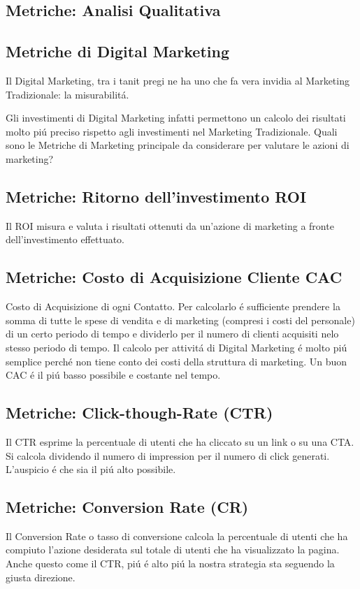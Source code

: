 \documentclass{article}
\begin{document}
\subsection{Metriche: Analisi Qualitativa}

\subsection{Metriche di Digital Marketing}
Il Digital Marketing, tra i tanit pregi ne ha uno che fa vera invidia al Marketing Tradizionale: la misurabilit\'a.

Gli investimenti di Digital Marketing infatti permettono un calcolo dei risultati molto pi\'u preciso rispetto agli investimenti nel Marketing Tradizionale. Quali sono le Metriche di Marketing principale da considerare per valutare le azioni di marketing?

\subsection{Metriche: Ritorno dell'investimento ROI}
Il ROI misura e valuta i risultati ottenuti da un'azione di marketing a fronte dell'investimento effettuato.

\subsection{Metriche: Costo di Acquisizione Cliente CAC}
Costo di Acquisizione di ogni Contatto. Per calcolarlo \'e sufficiente prendere la somma di tutte le spese di vendita e di marketing (compresi i costi del personale) di un certo periodo di tempo e dividerlo per il numero di clienti acquisiti nelo stesso periodo di tempo. Il calcolo per attivit\'a di Digital Marketing \'e molto pi\'u semplice perch\'e non tiene conto dei costi della struttura di marketing. Un buon CAC \'e il pi\'u basso possibile e costante nel tempo.  

\subsection{Metriche: Click-though-Rate (CTR)}
Il CTR esprime la percentuale di utenti che ha cliccato su un link o su una CTA. Si calcola dividendo il numero di impression per il numero di click generati. L'auspicio \'e che sia il pi\'u alto possibile.

\subsection{Metriche: Conversion Rate (CR)}
Il Conversion Rate o tasso di conversione calcola la percentuale di utenti che ha compiuto l'azione desiderata sul totale di utenti che ha visualizzato la pagina. Anche questo come il CTR, pi\'u \'e alto pi\'u la nostra strategia sta seguendo la giusta direzione. 
\end{document}
